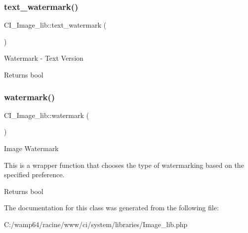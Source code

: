\subsubsection{\texorpdfstring{text\+\_\+watermark()}{text\_watermark()}}
{\footnotesize\ttfamily C\+I\+\_\+\+Image\+\_\+lib\+::text\+\_\+watermark (\begin{DoxyParamCaption}{ }\end{DoxyParamCaption})}

Watermark -\/ Text Version

\begin{DoxyReturn}{Returns}
bool 
\end{DoxyReturn}
\mbox{\label{class_c_i___image__lib_a2d6c65dd24032ffca929c55bd6f56833}} 
\subsubsection{\texorpdfstring{watermark()}{watermark()}}
{\footnotesize\ttfamily C\+I\+\_\+\+Image\+\_\+lib\+::watermark (\begin{DoxyParamCaption}{ }\end{DoxyParamCaption})}

Image Watermark

This is a wrapper function that chooses the type of watermarking based on the specified preference.

\begin{DoxyReturn}{Returns}
bool 
\end{DoxyReturn}


The documentation for this class was generated from the following file\+:\begin{DoxyCompactItemize}
\item 
C\+:/wamp64/racine/www/ci/system/libraries/Image\+\_\+lib.\+php\end{DoxyCompactItemize}

